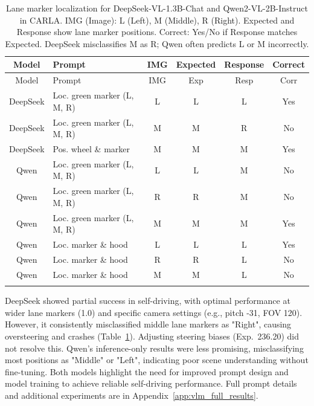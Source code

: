 \begin{longtable}{@{}clcccc@{}}
\toprule
Model & Prompt & IMG & Expected & Response & Correct \\
\midrule
\endfirsthead
\toprule
Model & Prompt & IMG & Exp & Resp & Corr \\
\midrule
\endhead
DeepSeek & Loc. green marker (L, M, R) & L & L & L & Yes \\
DeepSeek & Loc. green marker (L, M, R) & M & M & R & No \\
DeepSeek & Pos. wheel \& marker & M & M & M & Yes \\
Qwen & Loc. green marker (L, M, R) & L & L & M & No \\
Qwen & Loc. green marker (L, M, R) & R & R & M & No \\
Qwen & Loc. green marker (L, M, R) & M & M & M & Yes \\
Qwen & Loc. marker \& hood & L & L & L & Yes \\
Qwen & Loc. marker \& hood & R & R & L & No \\
Qwen & Loc. marker \& hood & M & M & L & No \\
\bottomrule
\caption{Lane marker localization for DeepSeek-VL-1.3B-Chat and Qwen2-VL-2B-Instruct in CARLA. IMG (Image): L (Left), M (Middle), R (Right). Expected and Response show lane marker positions. Correct: Yes/No if Response matches Expected. DeepSeek misclassifies M as R; Qwen often predicts L or M incorrectly.}
\label{tab:prompt_responses}
\end{longtable}

DeepSeek showed partial success in self-driving, with optimal performance at wider lane markers (1.0) and specific camera settings (e.g., pitch -31, FOV 120). However, it consistently misclassified middle lane markers as "Right", causing oversteering and crashes (Table~\ref{tab:prompt_responses}). Adjusting steering biases (Exp.~236.20) did not resolve this. Qwen's inference-only results were less promising, misclassifying most positions as "Middle" or "Left", indicating poor scene understanding without fine-tuning. Both models highlight the need for improved prompt design and model training to achieve reliable self-driving performance. Full prompt details and additional experiments are in Appendix~\ref{app:vlm_full_results}.


